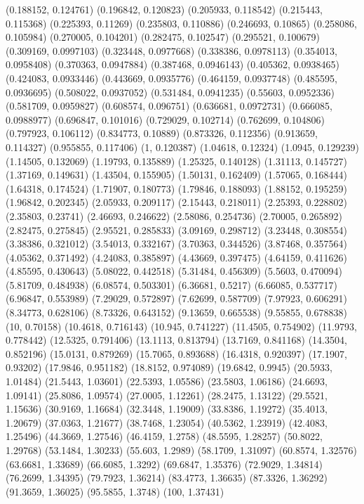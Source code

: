 {(0.188152, 0.124761)
(0.196842, 0.120823)
(0.205933, 0.118542)
(0.215443, 0.115368)
(0.225393, 0.11269)
(0.235803, 0.110886)
(0.246693, 0.10865)
(0.258086, 0.105984)
(0.270005, 0.104201)
(0.282475, 0.102547)
(0.295521, 0.100679)
(0.309169, 0.0997103)
(0.323448, 0.0977668)
(0.338386, 0.0978113)
(0.354013, 0.0958408)
(0.370363, 0.0947884)
(0.387468, 0.0946143)
(0.405362, 0.0938465)
(0.424083, 0.0933446)
(0.443669, 0.0935776)
(0.464159, 0.0937748)
(0.485595, 0.0936695)
(0.508022, 0.0937052)
(0.531484, 0.0941235)
(0.55603, 0.0952336)
(0.581709, 0.0959827)
(0.608574, 0.096751)
(0.636681, 0.0972731)
(0.666085, 0.0988977)
(0.696847, 0.101016)
(0.729029, 0.102714)
(0.762699, 0.104806)
(0.797923, 0.106112)
(0.834773, 0.10889)
(0.873326, 0.112356)
(0.913659, 0.114327)
(0.955855, 0.117406)
(1, 0.120387)
(1.04618, 0.12324)
(1.0945, 0.129239)
(1.14505, 0.132069)
(1.19793, 0.135889)
(1.25325, 0.140128)
(1.31113, 0.145727)
(1.37169, 0.149631)
(1.43504, 0.155905)
(1.50131, 0.162409)
(1.57065, 0.168444)
(1.64318, 0.174524)
(1.71907, 0.180773)
(1.79846, 0.188093)
(1.88152, 0.195259)
(1.96842, 0.202345)
(2.05933, 0.209117)
(2.15443, 0.218011)
(2.25393, 0.228802)
(2.35803, 0.23741)
(2.46693, 0.246622)
(2.58086, 0.254736)
(2.70005, 0.265892)
(2.82475, 0.275845)
(2.95521, 0.285833)
(3.09169, 0.298712)
(3.23448, 0.308554)
(3.38386, 0.321012)
(3.54013, 0.332167)
(3.70363, 0.344526)
(3.87468, 0.357564)
(4.05362, 0.371492)
(4.24083, 0.385897)
(4.43669, 0.397475)
(4.64159, 0.411626)
(4.85595, 0.430643)
(5.08022, 0.442518)
(5.31484, 0.456309)
(5.5603, 0.470094)
(5.81709, 0.484938)
(6.08574, 0.503301)
(6.36681, 0.5217)
(6.66085, 0.537717)
(6.96847, 0.553989)
(7.29029, 0.572897)
(7.62699, 0.587709)
(7.97923, 0.606291)
(8.34773, 0.628106)
(8.73326, 0.643152)
(9.13659, 0.665538)
(9.55855, 0.678838)
(10, 0.70158)
(10.4618, 0.716143)
(10.945, 0.741227)
(11.4505, 0.754902)
(11.9793, 0.778442)
(12.5325, 0.791406)
(13.1113, 0.813794)
(13.7169, 0.841168)
(14.3504, 0.852196)
(15.0131, 0.879269)
(15.7065, 0.893688)
(16.4318, 0.920397)
(17.1907, 0.93202)
(17.9846, 0.951182)
(18.8152, 0.974089)
(19.6842, 0.9945)
(20.5933, 1.01484)
(21.5443, 1.03601)
(22.5393, 1.05586)
(23.5803, 1.06186)
(24.6693, 1.09141)
(25.8086, 1.09574)
(27.0005, 1.12261)
(28.2475, 1.13122)
(29.5521, 1.15636)
(30.9169, 1.16684)
(32.3448, 1.19009)
(33.8386, 1.19272)
(35.4013, 1.20679)
(37.0363, 1.21677)
(38.7468, 1.23054)
(40.5362, 1.23919)
(42.4083, 1.25496)
(44.3669, 1.27546)
(46.4159, 1.2758)
(48.5595, 1.28257)
(50.8022, 1.29768)
(53.1484, 1.30233)
(55.603, 1.2989)
(58.1709, 1.31097)
(60.8574, 1.32576)
(63.6681, 1.33689)
(66.6085, 1.3292)
(69.6847, 1.35376)
(72.9029, 1.34814)
(76.2699, 1.34395)
(79.7923, 1.36214)
(83.4773, 1.36635)
(87.3326, 1.36292)
(91.3659, 1.36025)
(95.5855, 1.3748)
(100, 1.37431)
}
